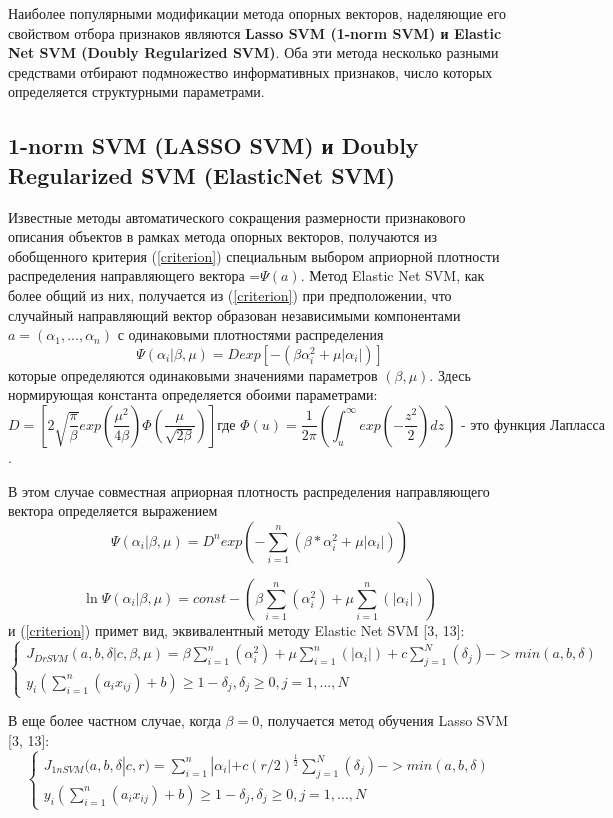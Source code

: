 \documentclass[../body.tex]{subfiles}
\begin{document}
Наиболее популярными модификации метода опорных векторов, наделяющие его свойством отбора признаков являются \textbf{Lasso SVM (1-norm SVM) и Elastic Net SVM (Doubly Regularized SVM)}. Оба эти метода несколько разными средствами отбирают подмножество информативных признаков, число которых определяется структурными параметрами.

\subsection{1-norm SVM (LASSO SVM) и Doubly Regularized SVM (ElasticNet SVM)}
Известные методы автоматического сокращения размерности признакового описания объектов в рамках метода опорных векторов,  получаются из обобщенного критерия (\ref{criterion}) специальным выбором априорной плотности распределения направляющего вектора =$\varPsi(a)$. Метод Elastic Net SVM, как более общий из них, получается из (\ref{criterion})  при предположении, что случайный направляющий вектор образован независимыми компонентами $a=(\alpha_1, ..., \alpha_n)$ с одинаковыми плотностями распределения \[\varPsi(\alpha_i|\beta,\mu)=Dexp[-(\beta\alpha_i^2+\mu|\alpha_i|)]\]
которые определяются одинаковыми значениями параметров $(\beta, \mu)$. Здесь нормирующая константа определяется обоими параметрами:
$$D=[2\sqrt{\frac{\pi}{\beta}}exp(\frac{\mu^2}{4\beta})\Phi(\dfrac{\mu}{\sqrt{2\beta}})]\mbox{где }\Phi(u)=\frac{1}{2\pi}(\int_{u}^{\infty}exp(-\frac{z^2}{2})dz)\mbox{ - это функция Лапласса}$$.

В этом случае совместная априорная плотность распределения направляющего вектора определяется выражением $$\varPsi(\alpha_i|\beta,\mu)=D^{n}exp(-\sum_{i=1}^{n}(\beta*\alpha^{2}_{i}+\mu|\alpha_{i}|))$$

$$
\ln\varPsi(\alpha_i|\beta,\mu) = const - (\beta\sum_{i=1}^{n}(\alpha_i^2)+\mu\sum_{i=1}^{n}(|\alpha_i|))
$$
 и (\ref{criterion}) примет вид, эквивалентный методу Elastic Net SVM [3, 13]: 
$$\left\{\begin{matrix}
J_{DrSVM}(a, b, \delta |c,\beta ,\mu ) = \beta\sum_{i=1}^{n}(\alpha_i^2)+\mu\sum_{i=1}^{n}(|\alpha_i|) + c\sum_{j=1}^{N}(\delta_j)->min(a,b,\delta)
	\\
	y_i(\sum_{i=1}^{n}(a_ix_{ij})+b)\geq1-\delta_j, \delta_j \geq 0, j= 1,...,N
\end{matrix}\right.$$

В еще более частном случае, когда $\beta = 0$, получается метод обучения Lasso SVM [3, 13]:
$$\left\{\begin{matrix}
	J_{1nSVM}(a, b, \delta |c,r ) = \sum_{i=1}^{n}|\alpha_i| + c(r/2)^{\frac{1}{2}}\sum_{j=1}^{N}(\delta_j)->min(a,b,\delta)
	\\
	y_i(\sum_{i=1}^{n}(a_ix_{ij})+b)\geq1-\delta_j, \delta_j \geq 0, j= 1,...,N
\end{matrix}\right.$$
\end{document}
